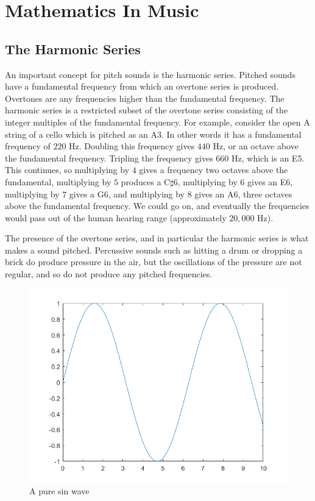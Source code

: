\chapter{Mathematics In Music} \label{mathinmusic}

\section{The Harmonic Series} \label{mathinmusic:harmonic}

An important concept for pitch sounds is the harmonic series.
Pitched sounds have a fundamental frequency from which an overtone series is produced.
Overtones are any frequencies higher than the fundamental frequency.
The harmonic series is a restricted subset of the overtone series consisting of the integer multiples of the fundamental frequency.
For example, consider the open A string of a cello which is pitched as an A3.
In other words it has a fundamental frequency of $220$ Hz.
Doubling this frequency gives $440$ Hz, or an octave above the fundamental frequency.
Tripling the frequency gives $660$ Hz, which is an E5.
This continues, so multiplying by $4$ gives a frequency two octaves above the fundamental, multiplying by $5$ produces a C$\sharp$6, multiplying by $6$ gives an E6, multiplying by $7$ gives a G6, and multiplying by $8$ gives an A6, three octaves above the fundamental frequency.
We could go on, and eventually the frequencies would pass out of the human hearing range (approximately $20,000$ Hz).

The presence of the overtone series, and in particular the harmonic series is what makes a sound pitched.
Percussive sounds such as hitting a drum or dropping a brick do produce pressure in the air, but the oscillations of the pressure are not regular, and so do not produce any pitched frequencies.

\begin{figure}
	\centering
	\includegraphics[width=\textwidth]{../figures/sinWave.png}
	\caption{A pure sin wave}
	\label{fig:sin}
\end{figure}

